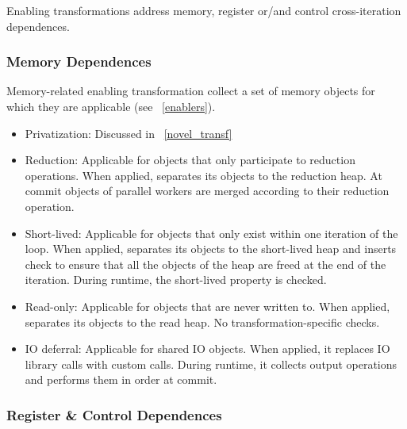 Enabling transformations address memory, register or/and control
cross-iteration dependences.

\subsubsection{Memory Dependences}

Memory-related enabling transformation collect a set of memory objects
for which they are applicable (see ~\ref{enablers}).


\begin{itemize}
%
\item Privatization: Discussed in ~\ref{novel_transf}

\item Reduction: Applicable for objects that only participate to
reduction operations. When applied, separates its objects to the
reduction heap. At commit objects of parallel workers are merged
according to their reduction operation.




\item Short-lived: Applicable for objects that only exist within one
iteration of the loop. When applied, separates its objects to the
short-lived heap and inserts check to ensure that all the objects of
the heap are freed at the end of the iteration. During runtime, the
short-lived property is checked.

\item Read-only: Applicable for objects that are never written to.
When applied, separates its objects to the read heap. No
transformation-specific checks.

\item IO deferral: Applicable for shared IO objects. When applied, it
replaces IO library calls with custom calls. During runtime, it
collects output operations and performs them in order at commit.

\end{itemize}

\subsubsection{Register \& Control Dependences}

